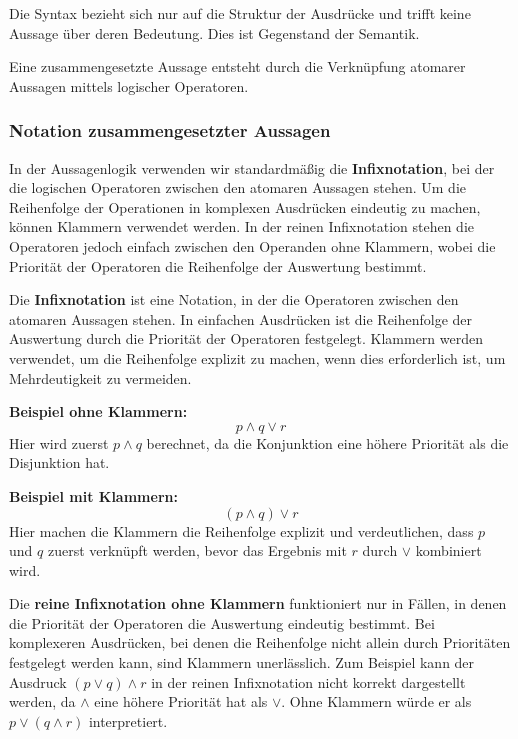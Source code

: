 \documentclass[main.tex]{subfiles}
\begin{document}
Die Syntax bezieht sich nur auf die Struktur der Ausdrücke und trifft keine Aussage über deren Bedeutung. Dies ist Gegenstand der Semantik.

\begin{definition}
Eine zusammengesetzte Aussage entsteht durch die Verknüpfung atomarer Aussagen mittels logischer Operatoren.
\end{definition}

\subsubsection{Notation zusammengesetzter Aussagen}

In der Aussagenlogik verwenden wir standardmäßig die \textbf{Infixnotation}, bei der die logischen Operatoren zwischen den atomaren Aussagen stehen. Um die Reihenfolge der Operationen in komplexen Ausdrücken eindeutig zu machen, können Klammern verwendet werden. In der reinen Infixnotation stehen die Operatoren jedoch einfach zwischen den Operanden ohne Klammern, wobei die Priorität der Operatoren die Reihenfolge der Auswertung bestimmt.

\begin{definition}[Infixnotation]
Die \textbf{Infixnotation} ist eine Notation, in der die Operatoren zwischen den atomaren Aussagen stehen. In einfachen Ausdrücken ist die Reihenfolge der Auswertung durch die Priorität der Operatoren festgelegt. Klammern werden verwendet, um die Reihenfolge explizit zu machen, wenn dies erforderlich ist, um Mehrdeutigkeit zu vermeiden.

\textbf{Beispiel ohne Klammern:} 
\[
p \land q \lor r
\]
Hier wird zuerst \(p \land q\) berechnet, da die Konjunktion eine höhere Priorität als die Disjunktion hat.

\textbf{Beispiel mit Klammern:} 
\[
(p \land q) \lor r
\]
Hier machen die Klammern die Reihenfolge explizit und verdeutlichen, dass \(p\) und \(q\) zuerst verknüpft werden, bevor das Ergebnis mit \(r\) durch \(\lor\) kombiniert wird.
\end{definition}

Die \textbf{reine Infixnotation ohne Klammern} funktioniert nur in Fällen, in denen die Priorität der Operatoren die Auswertung eindeutig bestimmt. Bei komplexeren Ausdrücken, bei denen die Reihenfolge nicht allein durch Prioritäten festgelegt werden kann, sind Klammern unerlässlich. Zum Beispiel kann der Ausdruck \((p \lor q) \land r\) in der reinen Infixnotation nicht korrekt dargestellt werden, da \(\land\) eine höhere Priorität hat als \(\lor\). Ohne Klammern würde er als \(p \lor (q \land r)\) interpretiert.
\end{document}
